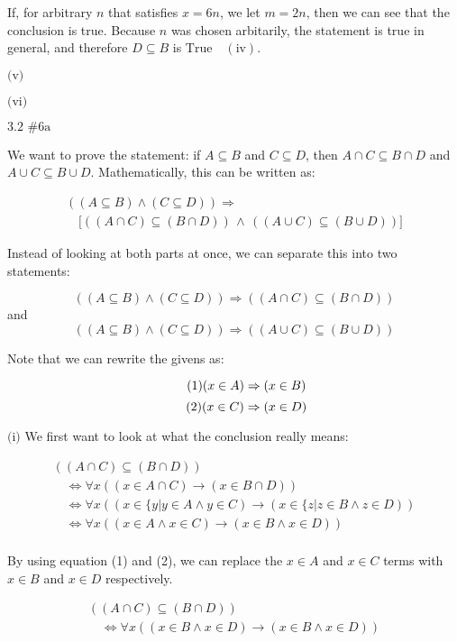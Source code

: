\documentclass{article}
\newcommand{\T}{\text{True}}
\newcommand{\problem}[2]{$\boxed{\text{#1 \##2}}$}
\newcommand{\subproblem}[1]{$\boxed{\text{(#1)}}$}
\newcommand{\subsolution}[2]{\boxed{#2\quad(\text{#1})}}
\newcommand{\subeq}{\subseteq}
\begin{document}
\begin{multicols*}{2}
If, for arbitrary $n$ that satisfies $x=6n$, we let $m=2n$, then we
can see that the conclusion is true. Because $n$ was chosen
arbitarily, the statement is true in general, and therefore
$D\subeq{}B$ is $\subsolution{iv}{\T}$.

%
\subproblem{v}

%
\subproblem{vi}

%
\problem{3.2}{6a}

We want to prove the statement: if $A\subeq{}B$ and $C\subeq{}D$, then
$A\cap{}C\subeq{}B\cap{}D$ and
$A\cup{}C\subeq{}B\cup{}D$. Mathematically, this can be written as:

\[
\begin{array}{l}
((A\subeq B)\wedge(C\subeq D))\Rightarrow \\
\quad \lbrack((A\cap C)\subeq(B\cap D))\,\wedge\,((A\cup C)\subeq(B\cup D))\rbrack
\end{array}
\]

Instead of looking at both parts at once, we can separate this into
two statements:

\[\tag{i}
((A\subeq B)\wedge(C\subeq D))\Rightarrow ((A\cap C)\subeq(B\cap D))
\] and \[\tag{ii}
((A\subeq B)\wedge(C\subeq D))\Rightarrow ((A\cup C)\subeq(B\cup D))
\]

Note that we can rewrite the givens as:

\[\tag{1}
(x\in A)\Rightarrow(x\in B) \\
\] \[\tag{2}
(x\in C)\Rightarrow(x\in D) \\
\]

%
\subproblem{i} We first want to look at what the conclusion really
means:

\[
\begin{array}{l}
((A\cap C)\subeq(B\cap D)) \\
\quad\Leftrightarrow \forall x((x\in A\cap C)\rightarrow(x\in B\cap D)) \\
\quad\Leftrightarrow \forall x((x\in\{y|y\in A\wedge y\in C)\rightarrow(x\in\{z|z\in B\wedge z\in D)) \\
\quad\Leftrightarrow \forall x((x\in A\wedge x\in C)\rightarrow(x\in B\wedge x\in D)) \\
\end{array}
\]

By using equation (1) and (2), we can replace the $x\in{}A$ and
$x\in{}C$ terms with $x\in{}B$ and $x\in{}D$ respectively.

\[
\begin{array}{l}
((A\cap C)\subeq(B\cap D)) \\
\quad\Leftrightarrow \forall x((x\in B\wedge x\in D)\rightarrow(x\in B\wedge x\in D))
\end{array}
\]


\end{multicols*}
\end{document}
